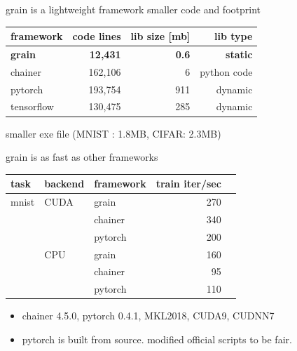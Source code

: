 \documentclass[aspectratio=169,
  14pt,xcolor=dvipsnames,table,professional font,dvipdfmx]{beamer}
\begin{document}
\begin{frame}[fragile]{grain is \alert{a lightweight framework}}
  smaller code and footprint
  \begin{table}
	\begin{tabular}{lrrr}
      \toprule
      framework   & code lines & lib size [mb] & lib type  \\
      \midrule
      \textbf{grain} &  \textbf{12,431} & \textbf{0.6}  & \textbf{static} \\
      chainer    & 162,106 & 6 & python code \\
      pytorch    & 193,754 & 911 &dynamic \\
      tensorflow & 130,475 & 285 & dynamic  \\
      \bottomrule
	\end{tabular}
  \end{table}
  smaller exe file (MNIST : 1.8MB, CIFAR: 2.3MB)
\end{frame}

\begin{frame}{grain is as \alert{fast} as other frameworks}
    \begin{table}
	\begin{tabular}{lllrr}
      \toprule
      task & backend  & framework & train iter/sec \\
      \midrule
      mnist & CUDA & grain      & 270 \\
            &      & chainer    & 340 \\
            &      & pytorch    & 200 \\
      \midrule
            & CPU  & grain      & 160 \\
            &      & chainer    &  95 \\
            &      & pytorch    & 110 \\
      \bottomrule
	\end{tabular}
    \end{table}
    \begin{itemize}
      \item chainer 4.5.0, pytorch 0.4.1, MKL2018, CUDA9, CUDNN7
      \item pytorch is built from source. modified official scripts to be fair.
    \end{itemize}
\end{frame}
\end{document}
